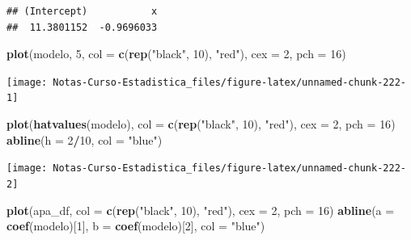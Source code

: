 \documentclass[
  12pt,
]{book}
\newenvironment{Shaded}{\begin{snugshade}}{\end{snugshade}}
\newcommand{\DataTypeTok}[1]{\textcolor[rgb]{0.13,0.29,0.53}{#1}}
\newcommand{\DecValTok}[1]{\textcolor[rgb]{0.00,0.00,0.81}{#1}}
\newcommand{\KeywordTok}[1]{\textcolor[rgb]{0.13,0.29,0.53}{\textbf{#1}}}
\newcommand{\NormalTok}[1]{#1}
\newcommand{\OperatorTok}[1]{\textcolor[rgb]{0.81,0.36,0.00}{\textbf{#1}}}
\newcommand{\StringTok}[1]{\textcolor[rgb]{0.31,0.60,0.02}{#1}}
\theoremstyle{definition}
\theoremstyle{definition}
\theoremstyle{definition}
\theoremstyle{remark}
\begin{document}
\begin{verbatim}
## (Intercept)           x 
##  11.3801152  -0.9696033
\end{verbatim}

\begin{Shaded}
\begin{Highlighting}[]
\KeywordTok{plot}\NormalTok{(modelo, }\DecValTok{5}\NormalTok{, }\DataTypeTok{col =} \KeywordTok{c}\NormalTok{(}\KeywordTok{rep}\NormalTok{(}\StringTok{"black"}\NormalTok{, }\DecValTok{10}\NormalTok{), }\StringTok{"red"}\NormalTok{), }\DataTypeTok{cex =} \DecValTok{2}\NormalTok{, }
    \DataTypeTok{pch =} \DecValTok{16}\NormalTok{)}
\end{Highlighting}
\end{Shaded}

\begin{center}\texttt{[image: Notas-Curso-Estadistica\_files/figure-latex/unnamed-chunk-222-1]} \end{center}

\begin{Shaded}
\begin{Highlighting}[]
\KeywordTok{plot}\NormalTok{(}\KeywordTok{hatvalues}\NormalTok{(modelo), }\DataTypeTok{col =} \KeywordTok{c}\NormalTok{(}\KeywordTok{rep}\NormalTok{(}\StringTok{"black"}\NormalTok{, }\DecValTok{10}\NormalTok{), }\StringTok{"red"}\NormalTok{), }
    \DataTypeTok{cex =} \DecValTok{2}\NormalTok{, }\DataTypeTok{pch =} \DecValTok{16}\NormalTok{)}
\KeywordTok{abline}\NormalTok{(}\DataTypeTok{h =} \DecValTok{2}\OperatorTok{/}\DecValTok{10}\NormalTok{, }\DataTypeTok{col =} \StringTok{"blue"}\NormalTok{)}
\end{Highlighting}
\end{Shaded}

\begin{center}\texttt{[image: Notas-Curso-Estadistica\_files/figure-latex/unnamed-chunk-222-2]} \end{center}

\begin{Shaded}
\begin{Highlighting}[]
\KeywordTok{plot}\NormalTok{(apa_df, }\DataTypeTok{col =} \KeywordTok{c}\NormalTok{(}\KeywordTok{rep}\NormalTok{(}\StringTok{"black"}\NormalTok{, }\DecValTok{10}\NormalTok{), }\StringTok{"red"}\NormalTok{), }\DataTypeTok{cex =} \DecValTok{2}\NormalTok{, }
    \DataTypeTok{pch =} \DecValTok{16}\NormalTok{)}
\KeywordTok{abline}\NormalTok{(}\DataTypeTok{a =} \KeywordTok{coef}\NormalTok{(modelo)[}\DecValTok{1}\NormalTok{], }\DataTypeTok{b =} \KeywordTok{coef}\NormalTok{(modelo)[}\DecValTok{2}\NormalTok{], }\DataTypeTok{col =} \StringTok{"blue"}\NormalTok{)}
\end{Highlighting}
\end{Shaded}
\end{document}
